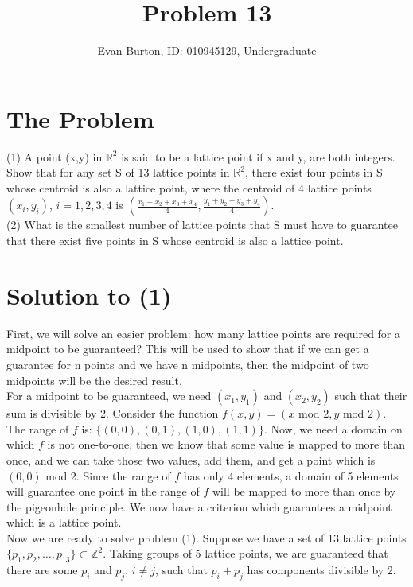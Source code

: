 \documentclass[]{article}
\title{Problem 13}
\author{Evan Burton, ID: 010945129, Undergraduate}
\begin{document}
\maketitle

\section{The Problem}
(1) A point (x,y) in $\mathbb{R}^2$ is said to be a lattice point if x and y, are both integers.  Show that for any set S of 13 lattice points in $\mathbb{R}^2$, there exist four points in S whose centroid is also a lattice point, where the centroid of 4 lattice points $(x_i,y_i)$, $i = 1,2,3,4$ is $\left(\frac{x_1+x_2+x_3+x_4}{4}, \frac{y_1+y_2+y_3+y_4}{4}\right)$.\\

      
\noindent(2) What is the smallest number of lattice points that S must have to guarantee that there exist five points in S whose centroid is also a lattice point.  


\section{Solution to (1)}
First, we will solve an easier problem: how many lattice points are required for a midpoint to be guaranteed? This will be used to show that if we can get a guarantee for n points and we have n midpoints, then the midpoint of two midpoints will be the desired result.\\

For a midpoint to be guaranteed, we need $(x_1, y_1)$ and $(x_2, y_2)$ such that their sum is divisible by 2. Consider the function $f(x, y) = (x \text{ mod } 2, y \text{ mod } 2)$.\\

The range of $f$ is: $\{(0,0), (0, 1), (1,0), (1,1)\}$. Now, we need a domain on which $f$ is not one-to-one, then we know that some value is mapped to more than once, and we can take those two values, add them, and get a point which is $(0,0)$ mod 2. Since the range of $f$ has only 4 elements, a domain of 5 elements will guarantee one point in the range of $f$ will be mapped to more than once by the pigeonhole principle. We now have a criterion which guarantees a midpoint which is a lattice point.\\

Now we are ready to solve problem (1). Suppose we have a set of 13 lattice points $\{p_1, p_2, \ldots, p_{13}\}\subset \mathbb{Z}^2$. Taking groups of 5 lattice points, we are guaranteed that there are some $p_i$ and $p_j$, $i \neq j$, such that $p_i+p_j$ has components divisible by 2.\\
\end{document}
